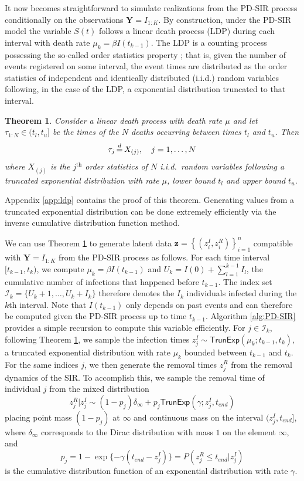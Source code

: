 \documentclass[12pt]{article}
\newtheorem{theorem}{Theorem}[section]
\begin{document}
	It now becomes straightforward to simulate realizations from the PD-SIR process conditionally on the observations $\mathbf{Y} = I_{1:K}$. By construction, under the PD-SIR model the variable $S(t)$ follows a linear death process (LDP) during each interval with death rate $\mu_k = \beta I(t_{k-1})$. 
	The LDP is a counting process possessing the so-called order statistics property \citep{Neuts.1971}; that is, given the number of events registered on some interval, the event times are distributed as the order statistics of independent and identically distributed (i.i.d.) random variables following, in the case of the LDP, a exponential distribution truncated to that interval.
	\begin{theorem}
		\label{theo:ldp}
		Consider a linear death process with death rate $\mu$ and let $\tau_{1:N} \in (t_l, t_u]$ be the times of the $N$ deaths occurring between times $t_l$ and $t_u$. Then 
		$$\tau_j \,{\buildrel d \over =}\, X_{(j)}, \quad j = 1, \dots, N$$
		where $X_{(j)}$ is the $j^{\text{th}}$ order statistics of $N$ i.i.d.\ random variables following a truncated exponential distribution with rate $\mu$, lower bound $t_l$ and upper bound $t_u$.
	\end{theorem}
	Appendix \ref{app:ldp} contains the proof of this theorem. Generating values from a truncated exponential distribution can be done extremely efficiently via the inverse cumulative distribution function method.
	
	We can use Theorem \ref{theo:ldp} to generate latent data  $\mathbf{z} = \left\lbrace (z^I_i, z^R_i)\right\rbrace_{i=1}^{n}$ compatible with $\mathbf{Y} = I_{1:K}$ from the PD-SIR process as follows. For each time interval $[t_{k-1}, t_k)$, we compute $\mu_k = \beta I(t_{k-1})$ and $U_k = I(0) + \sum_{l=1}^{k-1} I_l$, the cumulative number of infections that happened before $t_{k-1}$. The index set $\mathcal{I}_k = \{U_k + 1, \dots, U_k + I_k\}$ therefore denotes the $I_k$ individuals infected during the $k$th interval. Note that $I(t_{k-1})$ only depends on past events and can therefore be computed given the PD-SIR process up to time $t_{k-1}$. Algorithm \ref{alg:PD-SIR} provides a simple recursion to compute this variable efficiently. For $j \in \mathcal{I}_k$, following Theorem \ref{theo:ldp}, we sample the infection times $z^I_j \sim \textsf{TrunExp}(\mu_k; t_{k-1}, t_k)$, a truncated exponential distribution with rate $\mu_k$ bounded between $t_{k-1}$ and $t_k$. For the same indices $j$, we then generate the removal times $z^R_j$ from the removal dynamics of the SIR. To accomplish this, we sample the removal time of individual $j$ from the mixed distribution
	$$z^R_j|z^I_j \sim (1 - p_j) \delta_{\infty} + p_j \textsf{TrunExp}(\gamma; z^I_j, t_{end})$$
	placing point mass $(1 - p_j)$ at $\infty$ and continuous mass on the interval $(z^I_j, t_{end}]$,
	where $\delta_{\infty}$ corresponds to the Dirac distribution with mass $1$ on the element $\infty$, and
	$$p_j = 1 - \exp\{-\gamma (t_{end} - z^I_j)\} = P(z^R_j \le t_{end} | z^I_j)$$
	is the cumulative distribution function of an exponential distribution with rate $\gamma$. %
	
\end{document}
